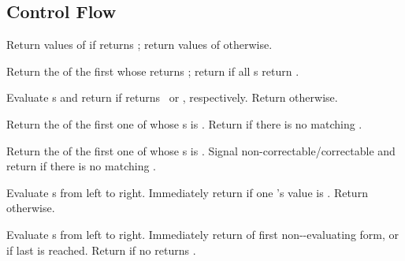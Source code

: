 \subsection{Control Flow}
\begin{LIST}{1cm}

  {
    Return values of  if  returns \T;
    return values of  otherwise. 
  }

  {
  Return the  of the first  whose
   returns \T; return \retval{\NIL} if all s
  return \NIL.
  }

  {
    Evaluate s and return  if 
    returns \T\ or \NIL, respectively. Return \retval{\NIL} otherwise. 
  }

  {
    Return the  of the first  one of
    whose s is  . Return  if there is no matching .
  }

  {
    Return the  of the first  one of
    whose s is  . Signal
    non-correctable/correctable  and return
    \retval{\NIL} if there is no matching .
  }

  {
    Evaluate s from left to right. Immediately return
    \retval{\NIL} if one 's value is \NIL. Return
     otherwise.
  }

  {
    Evaluate s from left to
    right. Immediately return  of first
    non-\NIL-evaluating form, or  if last 
    is reached. Return \retval{\NIL} if no  returns \T.
  }


\end{LIST}
